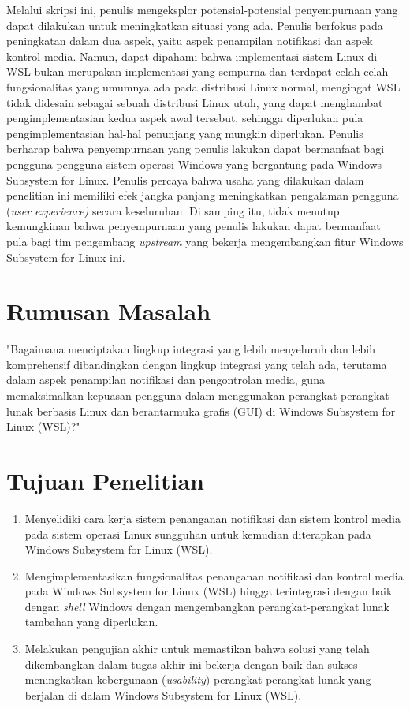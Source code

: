 Melalui skripsi ini, penulis mengeksplor potensial-potensial penyempurnaan yang dapat dilakukan untuk meningkatkan situasi yang ada. Penulis berfokus pada peningkatan dalam dua aspek, yaitu aspek penampilan notifikasi dan aspek kontrol media. Namun, dapat dipahami bahwa implementasi sistem Linux di WSL bukan merupakan implementasi yang sempurna dan terdapat celah-celah fungsionalitas yang umumnya ada pada distribusi Linux normal, mengingat WSL tidak didesain sebagai sebuah distribusi Linux utuh, yang dapat menghambat pengimplementasian kedua aspek awal tersebut, sehingga diperlukan pula pengimplementasian hal-hal penunjang yang mungkin diperlukan. Penulis berharap bahwa penyempurnaan yang penulis lakukan dapat bermanfaat bagi pengguna-pengguna sistem operasi Windows yang bergantung pada Windows Subsystem for Linux. Penulis percaya bahwa usaha yang dilakukan dalam penelitian ini memiliki efek jangka panjang meningkatkan pengalaman pengguna (\textit{user experience)} secara keseluruhan. Di samping itu, tidak menutup kemungkinan bahwa penyempurnaan yang penulis lakukan dapat bermanfaat pula bagi tim pengembang \textit{upstream} yang bekerja mengembangkan fitur Windows Subsystem for Linux ini.

\section{Rumusan Masalah}

"Bagaimana menciptakan lingkup integrasi yang lebih menyeluruh dan lebih komprehensif dibandingkan dengan lingkup integrasi yang telah ada, terutama dalam aspek penampilan notifikasi dan pengontrolan media, guna memaksimalkan kepuasan pengguna dalam menggunakan perangkat-perangkat lunak berbasis Linux dan berantarmuka grafis (GUI) di Windows Subsystem for Linux (WSL)?"


\section{Tujuan Penelitian}

\begin{enumerate}
    \item Menyelidiki cara kerja sistem penanganan notifikasi dan sistem kontrol media pada sistem operasi Linux sungguhan untuk kemudian diterapkan pada Windows Subsystem for Linux (WSL).

    \item Mengimplementasikan fungsionalitas penanganan notifikasi dan kontrol media pada Windows Subsystem for Linux (WSL) hingga terintegrasi dengan baik dengan \textit{shell} Windows dengan mengembangkan perangkat-perangkat lunak tambahan yang diperlukan.

    \item Melakukan pengujian akhir untuk memastikan bahwa solusi yang telah dikembangkan dalam tugas akhir ini bekerja dengan baik dan sukses meningkatkan kebergunaan (\textit{usability}) perangkat-perangkat lunak yang berjalan di dalam Windows Subsystem for Linux (WSL).
\end{enumerate}


